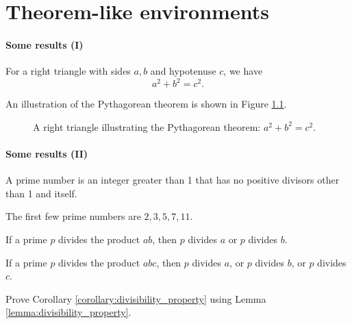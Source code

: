 \setcounter{chapter}{2}
\chapter{Theorem-like environments}

\begin{frame}
\frametitle{Some results (I)}
\begin{theorem}[Pythagoras]
For a right triangle with sides $a, b$ and hypotenuse $c$, we have
\[
a^2 + b^2 = c^2.
\]
\end{theorem}

An illustration of the Pythagorean theorem is shown in Figure \ref{fig:pythagorean}.

\begin{figure}
\centering
{}
\caption{A right triangle illustrating the Pythagorean theorem: $a^2 + b^2 = c^2$.}
\label{fig:pythagorean}
\end{figure}

\end{frame}

\begin{frame}
\frametitle{Some results (II)}
\begin{definition}
A prime number is an integer greater than 1 that has no positive divisors other than 1 and itself.
\end{definition}

\begin{example}
The first few prime numbers are $2, 3, 5, 7, 11$.
\end{example}

\begin{lemma}
If a prime $p$ divides the product $ab$, then $p$ divides $a$ or $p$ divides $b$.
\label{lemma:divisibility_property}
\end{lemma}

\begin{corollary}
If a prime $p$ divides the product $abc$, then $p$ divides $a$, or $p$ divides $b$, or $p$ divides $c$.
\label{corollary:divisibility_property}
\end{corollary}

\begin{exercise}
Prove Corollary \ref{corollary:divisibility_property} using Lemma \ref{lemma:divisibility_property}.
\end{exercise}

\end{frame}

